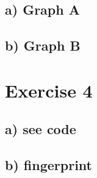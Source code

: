 \documentclass{article}
\begin{document}
\subsection*{a) Graph A}

\subsection*{b) Graph B}




\vspace{2cm}
\section*{Exercise 4}
\subsection*{a) see code}
\subsection*{b) fingerprint}
\end{document}
